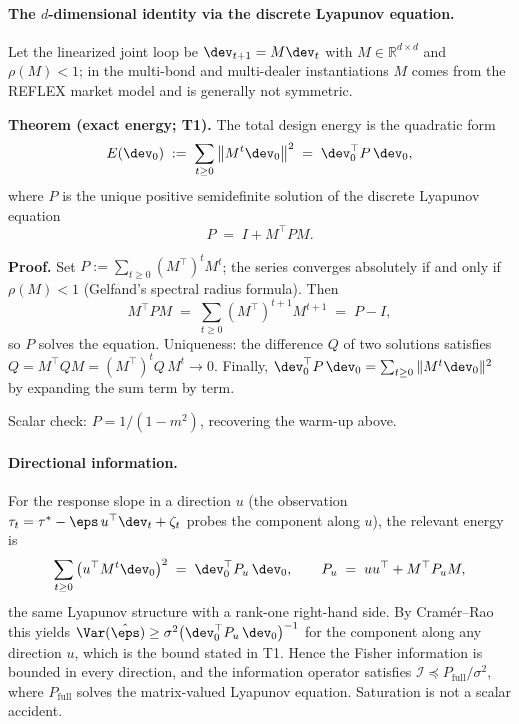 \paragraph{The $d$-dimensional identity via the discrete Lyapunov equation.}
Let the linearized joint loop be $\dev_{t+1} = M \dev_t$ with
$M \in \mathbb{R}^{d \times d}$ and $\rho(M) < 1$; in the multi-bond and
multi-dealer instantiations $M$ comes from the REFLEX market model
\citep{reflex2026} and is generally not symmetric.

\textbf{Theorem (exact energy; T1).} The total design energy is the
quadratic form
\begin{equation*}
E(\dev_0) \;:=\; \sum_{t \ge 0} \big\| M^t \dev_0 \big\|^2
\;=\; \dev_0^\top P\,\dev_0,
\end{equation*}
where $P$ is the unique positive semidefinite solution of the discrete
Lyapunov equation
\begin{equation*}
P \;=\; I + M^\top P M.
\end{equation*}

\textbf{Proof.} Set $P := \sum_{t \ge 0} (M^\top)^t M^t$; the series
converges absolutely if and only if $\rho(M) < 1$ (Gelfand's spectral
radius formula). Then
\begin{equation*}
M^\top P M \;=\; \sum_{t \ge 0} (M^\top)^{t+1} M^{t+1} \;=\; P - I,
\end{equation*}
so $P$ solves the equation. Uniqueness: the difference $Q$ of two solutions
satisfies $Q = M^\top Q M = (M^\top)^t Q\, M^t \to 0$. Finally,
$\dev_0^\top P\,\dev_0 = \sum_{t \ge 0} \|M^t \dev_0\|^2$ by expanding the
sum term by term. \qedsymbol

Scalar check: $P = 1/(1 - m^2)$, recovering the warm-up above.

\paragraph{Directional information.}
For the response slope in a direction $u$ (the observation
$\tau_t = \tau^{*} - \eps\, u^\top \dev_t + \zeta_t$ probes the component
along $u$), the relevant energy is
\begin{equation*}
\sum_{t \ge 0} \big( u^\top M^t \dev_0 \big)^2
\;=\; \dev_0^\top P_u\,\dev_0,
\qquad
P_u \;=\; u u^\top + M^\top P_u M,
\end{equation*}
the same Lyapunov structure with a rank-one right-hand side. By
Cram\'er--Rao this yields
$\Var(\hat\eps) \ge \sigma^2 \big( \dev_0^\top P_u\,\dev_0 \big)^{-1}$ for
the component along any direction $u$, which is the bound stated in T1.
Hence the Fisher information is bounded in every direction, and the
information operator satisfies
$\mathcal{I} \preceq P_{\mathrm{full}} / \sigma^2$, where
$P_{\mathrm{full}}$ solves the matrix-valued Lyapunov equation. Saturation
is not a scalar accident.


